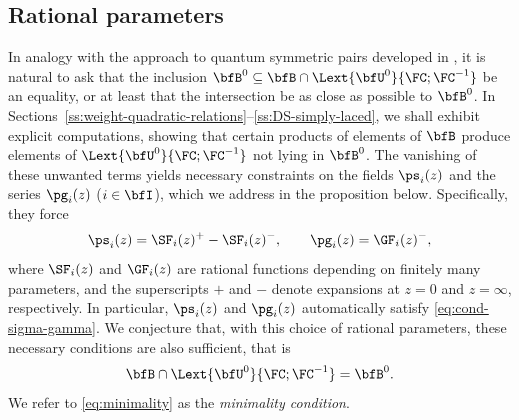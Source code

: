 \documentclass[reqno]{amsart}
\numberwithin{equation}{section}
\begin{document}
\subsection{Rational parameters}\label{ss:SF+GF}
In analogy with the approach to quantum symmetric pairs developed in \cite{letzter-02,kolb-14}, it is natural to ask that the inclusion $\bfB^0\subseteq\bfB\cap\Lext{\bfU^0}{\FC;\FC^{-1}}$ be an equality, or at least that 
the intersection be as close as possible to $\bfB^0$. 
In Sections~\ref{ss:weight-quadratic-relations}--\ref{ss:DS-simply-laced}, 
we shall exhibit explicit computations, showing that certain products of 
elements of $\bfB$ produce elements of 
$\Lext{\bfU^0}{\FC;\FC^{-1}}$ not lying in $\bfB^0$. The vanishing of 
these unwanted terms yields necessary constraints on the fields $\ps_i(z)$ 
and the series $\pg_i(z)$ ($i\in\bfI$), which we address in the proposition below. Specifically, they force
\[
\ps_i(z)=\SF_i(z)^+-\SF_i(z)^-,
\qquad
\pg_i(z)=\GF_i(z)^-,
\]
where $\SF_i(z)$ and $\GF_i(z)$ are rational functions depending on finitely many parameters, and the superscripts $+$ and $-$ denote expansions at $z=0$ and $z=\infty$, respectively. In particular, $\ps_i(z)$ and $\pg_i(z)$
automatically satisfy \eqref{eq:cond-sigma-gamma}. We conjecture that, 
with this choice of rational parameters, these necessary conditions are 
also sufficient, that is
\begin{equation}\label{eq:minimality}
	\bfB\cap\Lext{\bfU^0}{\FC;\FC^{-1}}=\bfB^0.
\end{equation}
We refer to \eqref{eq:minimality} as the \emph{minimality condition}.
\end{document}
